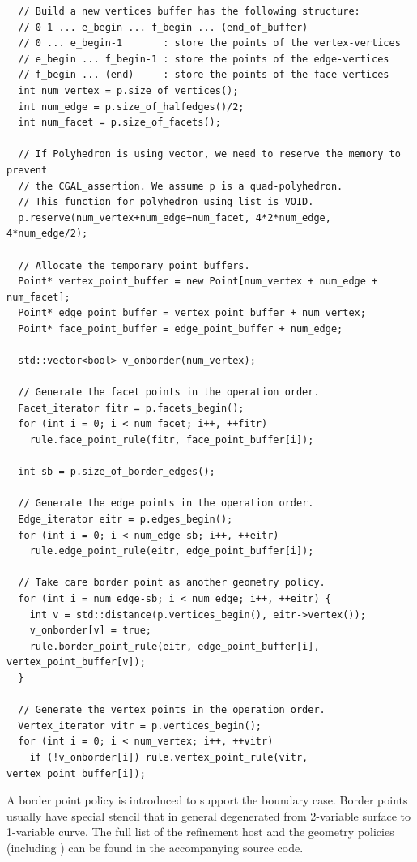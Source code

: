 \begin{lstlisting}
  // Build a new vertices buffer has the following structure:
  // 0 1 ... e_begin ... f_begin ... (end_of_buffer)
  // 0 ... e_begin-1       : store the points of the vertex-vertices
  // e_begin ... f_begin-1 : store the points of the edge-vertices
  // f_begin ... (end)     : store the points of the face-vertices
  int num_vertex = p.size_of_vertices();
  int num_edge = p.size_of_halfedges()/2;
  int num_facet = p.size_of_facets();

  // If Polyhedron is using vector, we need to reserve the memory to prevent 
  // the CGAL_assertion. We assume p is a quad-polyhedron.
  // This function for polyhedron using list is VOID.
  p.reserve(num_vertex+num_edge+num_facet, 4*2*num_edge, 4*num_edge/2);

  // Allocate the temporary point buffers.
  Point* vertex_point_buffer = new Point[num_vertex + num_edge + num_facet];
  Point* edge_point_buffer = vertex_point_buffer + num_vertex;
  Point* face_point_buffer = edge_point_buffer + num_edge;

  std::vector<bool> v_onborder(num_vertex);

  // Generate the facet points in the operation order.
  Facet_iterator fitr = p.facets_begin();
  for (int i = 0; i < num_facet; i++, ++fitr)
    rule.face_point_rule(fitr, face_point_buffer[i]);

  int sb = p.size_of_border_edges();

  // Generate the edge points in the operation order.
  Edge_iterator eitr = p.edges_begin();
  for (int i = 0; i < num_edge-sb; i++, ++eitr)
    rule.edge_point_rule(eitr, edge_point_buffer[i]);
    
  // Take care border point as another geometry policy. 
  for (int i = num_edge-sb; i < num_edge; i++, ++eitr) {
    int v = std::distance(p.vertices_begin(), eitr->vertex());
    v_onborder[v] = true;
    rule.border_point_rule(eitr, edge_point_buffer[i], vertex_point_buffer[v]);
  }

  // Generate the vertex points in the operation order.
  Vertex_iterator vitr = p.vertices_begin();
  for (int i = 0; i < num_vertex; i++, ++vitr)
    if (!v_onborder[i]) rule.vertex_point_rule(vitr, vertex_point_buffer[i]);
\end{lstlisting}
A border point policy is introduced to support the boundary case.
Border points usually have special stencil that in general degenerated from
2-variable surface to 1-variable curve. The full list of the refinement 
host and the geometry policies 
(including ) can be found in the 
accompanying source code.


